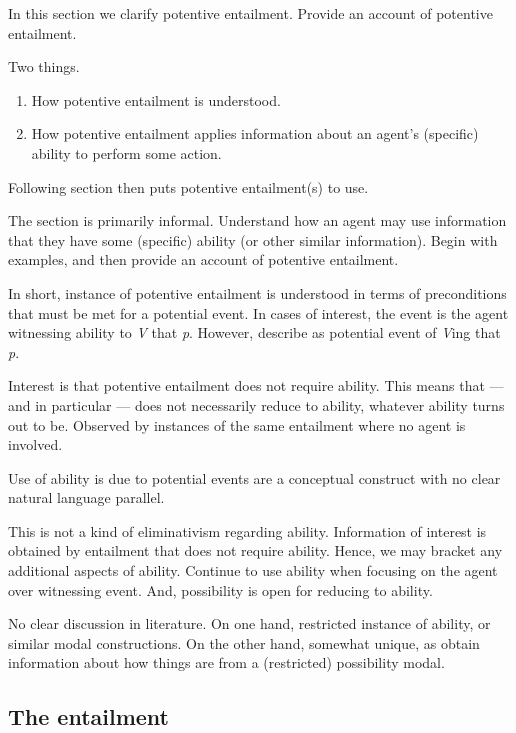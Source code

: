 \begin{note}[Overview]
  In this section we clarify potentive entailment.
  Provide an account of potentive entailment.

  Two things.
  \begin{enumerate}
  \item How potentive entailment is understood.
  \item How potentive entailment applies information about an agent's (specific) ability to perform some action.
  \end{enumerate}
  Following section then puts potentive entailment(s) to use.

  The section is primarily informal.
  Understand how an agent may use information that they have some (specific) ability (or other similar information).
  Begin with examples, and then provide an account of potentive entailment.

  In short, instance of potentive entailment is understood in terms of preconditions that must be met for a potential event.
  In cases of interest, the event is the agent witnessing ability to \emph{V} that \emph{p}.
  However, describe as potential event of \emph{V}ing that \emph{p}.

  Interest is that potentive entailment does not require ability.
  This means that \AR{} --- and in particular --- \WR{} does not necessarily reduce to ability, whatever ability turns out to be.
  Observed by instances of the same entailment where no agent is involved.

  Use of ability is due to potential events are a conceptual construct with no clear natural language parallel.

  This is not a kind of eliminativism regarding ability.
  Information of interest is obtained by entailment that does not require ability.
  Hence, we may bracket any additional aspects of ability.
  Continue to use ability when focusing on the agent over witnessing event.
  And, possibility is open for reducing to ability.

  No clear discussion in literature.
  On one hand, restricted instance of ability, or similar modal constructions.
  On the other hand, somewhat unique, as obtain information about how things are from a (restricted) possibility modal.
\end{note}

\subsection{The entailment}
\label{sec:entailment}

